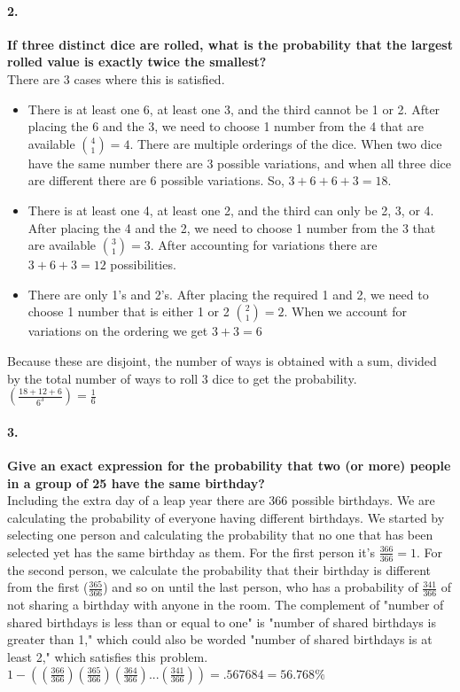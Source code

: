 \documentclass{article}
\begin{document}
\paragraph{2. }
\textbf{If three distinct dice are rolled, what is the probability that the largest rolled value is exactly twice the smallest?}\\
There are 3 cases where this is satisfied.
\begin{itemize}
\item There is at least one 6, at least one 3, and the third cannot be 1 or 2. After placing the 6 and the 3, we need to choose 1 number from the 4 that are available ${4 \choose 1} = 4$. There are multiple orderings of the dice. When two dice have the same number there are 3 possible variations, and when all three dice are different there are 6 possible variations. So, ${3 + 6 + 6 + 3 = 18}$.
\item There is at least one 4, at least one 2, and the third can only be 2, 3, or 4. After placing the 4 and the 2, we need to choose 1 number from the 3 that are available ${3 \choose 1} = 3$. After accounting for variations there are ${3 + 6 + 3 = 12}$ possibilities.
\item There are only 1's and 2's. After placing the required 1 and 2, we need to choose 1 number that is either 1 or 2 ${2 \choose 1} = 2$. When we account for variations on the ordering we get ${3 + 3 = 6}$
\end{itemize}
Because these are disjoint, the number of ways is obtained with a sum, divided by the total number of ways to roll 3 dice to get the probability.\\
$\boxed{\left( \frac{18+12+6}{6^3} \right) = \frac{1}{6}}$

\pagebreak

\paragraph{3. }
\textbf{Give an exact expression for the probability that two (or more) people in a group of 25 have the same birthday?}\\
Including the extra day of a leap year there are 366 possible birthdays. We are calculating the probability of everyone having different birthdays. We started by selecting one person and calculating the probability that no one that has been selected yet has the same birthday as them. For the first person it's $\frac{366}{366} = 1$. For the second person, we calculate the probability that their birthday is different from the first ($\frac{365}{366}$) and so on until the last person, who has a probability of $\frac{341}{366}$ of not sharing a birthday with anyone in the room. The complement of "number of shared birthdays is less than or equal to one" is "number of shared birthdays is greater than 1," which could also be worded "number of shared birthdays is at least 2," which satisfies this problem.\\
$\boxed{1 - ((\frac{366}{366}) (\frac{365}{366}) (\frac{364}{366}) ... (\frac{341}{366})) = .567684 = 56.768\%}$
\end{document}

